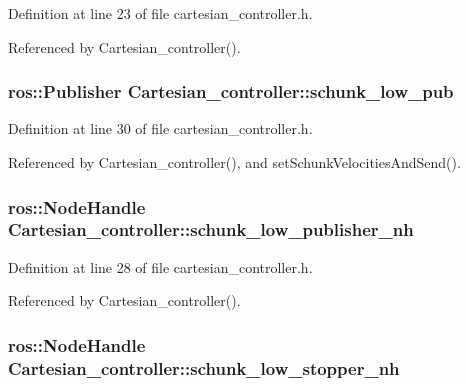 Definition at line 23 of file cartesian\-\_\-controller.\-h.



Referenced by Cartesian\-\_\-controller().

\hypertarget{classCartesian__controller_aa6ce9cffdd307127ed814d6e5132eba2}{
\subsubsection[{schunk\-\_\-low\-\_\-pub}]{\setlength{\rightskip}{0pt plus 5cm}ros\-::\-Publisher Cartesian\-\_\-controller\-::schunk\-\_\-low\-\_\-pub\hspace{0.3cm}{\ttfamily [protected]}}}\label{classCartesian__controller_aa6ce9cffdd307127ed814d6e5132eba2}


Definition at line 30 of file cartesian\-\_\-controller.\-h.



Referenced by Cartesian\-\_\-controller(), and set\-Schunk\-Velocities\-And\-Send().

\hypertarget{classCartesian__controller_a7df4ce63bf0551bfa7061bc718cd68d2}{
\subsubsection[{schunk\-\_\-low\-\_\-publisher\-\_\-nh}]{\setlength{\rightskip}{0pt plus 5cm}ros\-::\-Node\-Handle Cartesian\-\_\-controller\-::schunk\-\_\-low\-\_\-publisher\-\_\-nh\hspace{0.3cm}{\ttfamily [protected]}}}\label{classCartesian__controller_a7df4ce63bf0551bfa7061bc718cd68d2}


Definition at line 28 of file cartesian\-\_\-controller.\-h.



Referenced by Cartesian\-\_\-controller().

\hypertarget{classCartesian__controller_a57b1869ec960e75e435e1f882a02d80e}{
\subsubsection[{schunk\-\_\-low\-\_\-stopper\-\_\-nh}]{\setlength{\rightskip}{0pt plus 5cm}ros\-::\-Node\-Handle Cartesian\-\_\-controller\-::schunk\-\_\-low\-\_\-stopper\-\_\-nh\hspace{0.3cm}{\ttfamily [protected]}}}\label{classCartesian__controller_a57b1869ec960e75e435e1f882a02d80e}


